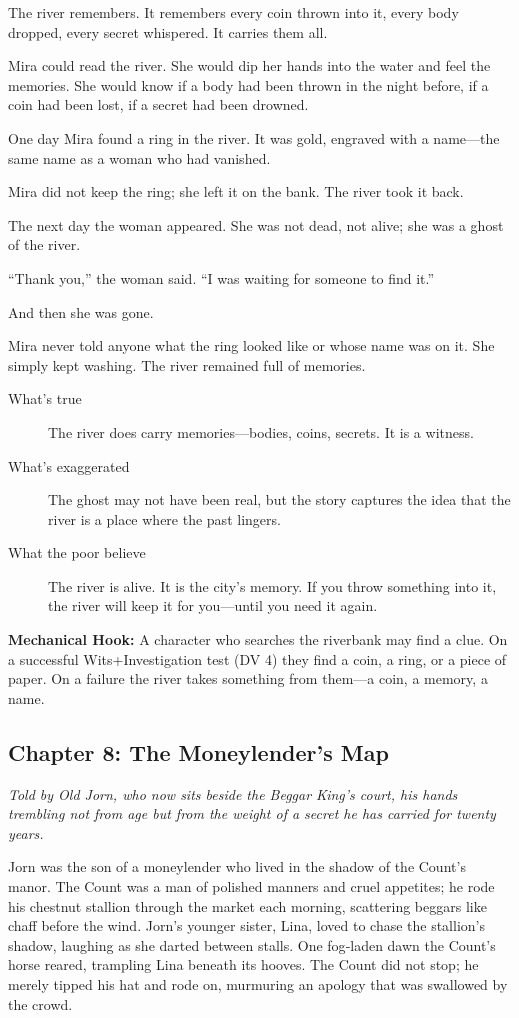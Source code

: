 \documentclass[11pt]{article}
\begin{document}
The river remembers. It remembers every coin thrown into it, every body dropped, every secret whispered. It carries them all.

Mira could read the river. She would dip her hands into the water and feel the memories. She would know if a body had been thrown in the night before, if a coin had been lost, if a secret had been drowned.

One day Mira found a ring in the river. It was gold, engraved with a name—the same name as a woman who had vanished.

Mira did not keep the ring; she left it on the bank. The river took it back.

The next day the woman appeared. She was not dead, not alive; she was a ghost of the river.

“Thank you,” the woman said. “I was waiting for someone to find it.”

And then she was gone.

Mira never told anyone what the ring looked like or whose name was on it. She simply kept washing. The river remained full of memories.

\begin{description}
\item[What's true] The river does carry memories—bodies, coins, secrets. It is a witness.
\item[What's exaggerated] The ghost may not have been real, but the story captures the idea that the river is a place where the past lingers.
\item[What the poor believe] The river is alive. It is the city’s memory. If you throw something into it, the river will keep it for you—until you need it again.
\end{description}

\textbf{Mechanical Hook:} A character who searches the riverbank may find a clue. On a successful Wits+Investigation test (DV 4) they find a coin, a ring, or a piece of paper. On a failure the river takes something from them—a coin, a memory, a name.

\subsection{Chapter 8: The Moneylender's Map}
\textit{Told by Old Jorn, who now sits beside the Beggar King’s court, his hands trembling not from age but from the weight of a secret he has carried for twenty years.}

Jorn was the son of a moneylender who lived in the shadow of the Count’s manor. The Count was a man of polished manners and cruel appetites; he rode his chestnut stallion through the market each morning, scattering beggars like chaff before the wind. Jorn’s younger sister, Lina, loved to chase the stallion’s shadow, laughing as she darted between stalls. One fog‑laden dawn the Count’s horse reared, trampling Lina beneath its hooves. The Count did not stop; he merely tipped his hat and rode on, murmuring an apology that was swallowed by the crowd.
\end{document}

